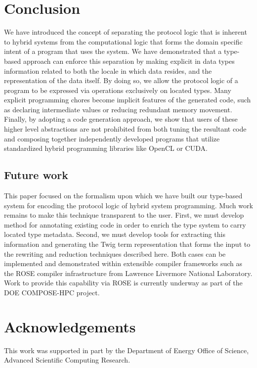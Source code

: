 
\section{Conclusion}

We have introduced the concept of separating the protocol logic that is inherent
to hybrid systems from the computational logic that forms the domain specific
intent of a program that uses the system. We have demonstrated that a type-based
approach can enforce this separation by making explicit in data types
information related to both the locale in which data resides, and the
representation of the data itself. By doing so, we allow the protocol logic of a
program to be expressed via operations exclusively on located types. Many
explicit programming chores become implicit features of the generated code, such
as declaring intermediate values or reducing redundant memory movement. Finally,
by adopting a code generation approach, we show that users of these higher level
abstractions are not prohibited from both tuning the resultant code and
composing together independently developed programs that utilize standardized
hybrid programming libraries like OpenCL or CUDA.

\subsection{Future work}

This paper focused on the formalism upon which we have built our type-based
system for encoding the protocol logic of hybrid system programming. Much work
remains to make this technique transparent to the user. First, we must develop
method for annotating existing code in order to enrich the type system to carry
located type metadata. Second, we must develop tools for extracting this
information and generating the Twig term representation that forms the input to
the rewriting and reduction techniques described here. Both cases can be
implemented and demonstrated within extensible compiler frameworks such as the
ROSE compiler infrastructure from Lawrence Livermore National Laboratory. Work
to provide this capability via ROSE is currently underway as part of the DOE
COMPOSE-HPC project.

\section{Acknowledgements}

This work was supported in part by the Department of Energy Office of Science,
Advanced Scientific Computing Research.
